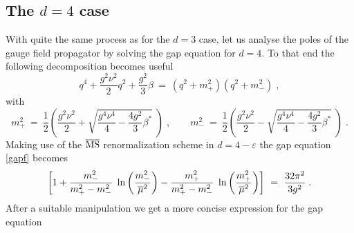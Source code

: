 













\subsection{The $d=4$ case}
With quite the same process as for the $d=3$ case, let us analyse the poles of the gauge field propagator by solving the gap equation for $d=4$. To that end the following decomposition becomes useful
\begin{equation}
q^4 +  \frac{g^{2}\nu^{2}}{2} q^2
+ \frac{g^2}{3} \beta   ~=~ (q^2+m^2_+) (q^2+m^2_-) \;,  
\label{dec1}
\end{equation}
with
\begin{equation}
m^2_+ ~=~ \frac{1}{2} \left(\frac{g^2 \nu^2}{2} + \sqrt{\frac{g^4\nu^4}{4}  -\frac{4g^2}{3} \beta^*} \;  \right) \;,  \qquad    m^2_- ~=~ \frac{1}{2} \left(\frac{g^2 \nu^2}{2} -\sqrt{\frac{g^4\nu^4}{4}  -\frac{4g^2}{3} \beta^*} \;  \right)  \;.
\label{roots1}
\end{equation}
Making use of the $\overline{\mbox{MS}}$ renormalization scheme in $d=4-\varepsilon$ 
the gap equation \eqref{gapf} becomes
\begin{equation}
\left[1 + \frac{m^2_{-}}{m^2_+ -  m^2_-}\; \ln\left( \frac{m^2_-}{{\overline{\mu}}^2} \right)  - \frac{m^2_+}{m^2_+ -  m^2_-}\; \ln\left( \frac{m^2_+}{{\overline{\mu}}^2} \right)  \right] ~=~ \frac{32\pi^2}{3g^2}  \;. 
\label{gapf1}
\end{equation}
After a suitable manipulation we get a more concise expression for the gap equation
